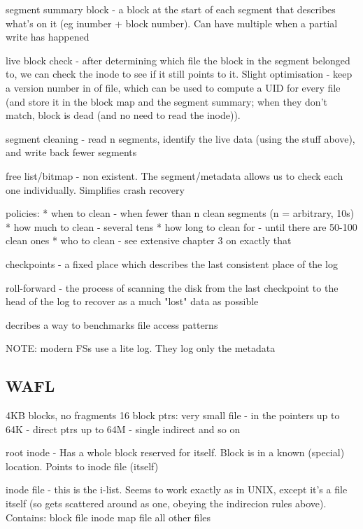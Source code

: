 \documentclass[a4paper]{report}
\begin{document}
        segment summary block - a block at the start of each segment that
        describes what's on it (eg inumber + block number). Can have multiple
        when a partial write has happened

        live block check - after determining which file the block in the
        segment belonged to, we can check the inode to see if it still points
        to it. Slight optimisation - keep a version number in of file, which
        can be used to compute a UID for every file (and store it in the block
        map and the segment summary; when they don't match, block is dead (and
        no need to read the inode)).

        segment cleaning - read n segments, identify the live data (using the
        stuff above), and write back fewer segments

        free list/bitmap - non existent. The segment/metadata allows us to
        check each one individually. Simplifies crash recovery

        policies:
        * when to clean - when fewer than n clean segments (n = arbitrary, 10s)
        * how much to clean - several tens
        * how long to clean for - until there are 50-100 clean ones
        * who to clean - see extensive chapter 3 on exactly that

        checkpoints - a fixed place which describes the last consistent place
        of the log

        roll-forward - the process of scanning the disk from the last
        checkpoint to the head of the log to recover as a much "lost" data as
        possible



        decribes a way to benchmarks file access patterns

        NOTE: modern FSs use a lite log. They log only the metadata


    \subsection{WAFL}
        4KB blocks, no fragments
        16 block ptrs:
            very small file - in the pointers
            up to 64K - direct ptrs
            up to 64M - single indirect and so on

        root inode - Has a whole block reserved for itself. Block is in a known
        (special) location. Points to inode file (itself)

        inode file - this is the i-list. Seems to work exactly as in UNIX,
        except it's a file itself (so gets scattered around as one, obeying the
        indirecion rules above). Contains:
            block file
            inode map file
            all other files
\end{document}

